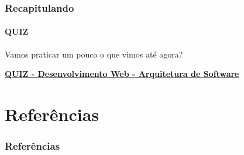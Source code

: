 \documentclass[
	10pt, %
	t, %
]{beamer}
\begin{document}
\begin{frame}
	\frametitle{Recapitulando}
	\framesubtitle{QUIZ}

	Vamos praticar um pouco o que vimos até agora?
	\vfill

	\bigskip
	\centering

	\href{https://quizizz.com/admin/quiz/65832b860b273f1989868234?source=quiz_share}{\textbf{QUIZ - Desenvolvimento Web - Arquitetura de Software}}
	\vfill
		
\end{frame}








\section{Referências}

\begin{frame}
	\frametitle{Referências}
	\printbibliography
\end{frame}

\end{document}
